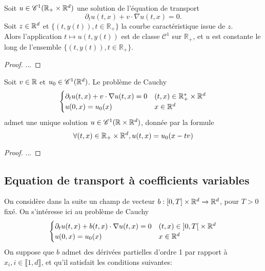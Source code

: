 \documentclass[french,a4paper,10pt]{article}
\begin{document}
            \begin{proposition}\label{prop:1.1.3}
                Soit \( u \in \mathscr{C}^1(\mathbb{R}_+ \times \mathbb{R}^d) \) une solution de l'équation de transport 
                \[
                \partial_t u(t,x) +v \cdot \nabla u(t,x) = 0.
                \]
                Soit \( z \in \mathbb{R}^d \) et \( \{ (t, y(t)), t \in \mathbb{R}_+ \} \) la courbe caractéristique issue de \( z \). \\
                Alors l'application \( t \mapsto u(t, y(t)) \) est de classe \( \mathscr{C}^1 \) sur \( \mathbb{R}_+ \), et \( u \) est constante le long de l'ensemble \( \{ (t, y(t)), t \in \mathbb{R}_+ \} \).
            \end{proposition}
        
            \begin{proof}
                ...
            \end{proof}
            
            \begin{theorem}\label{thm:1.1.4}
                Soit $v \in \mathbb{R}$ et $u_0 \in \mathscr{C}^1(\mathbb{R}^d)$. Le problème de Cauchy
                \[
                \begin{cases}
                    \partial_t u(t,x) + v \cdot \nabla u(t,x)  = 0 & (t,x) \in \mathbb{R}^*_+ \times \mathbb{R}^d \\
                    u(0,x)  = u_0(x) &x \in \mathbb{R}^d
                \end{cases}
                \]
                admet une unique solution $u \in \mathscr{C}^1(\mathbb{R} \times \mathbb{R}^d)$, donnée par la formule 
                \[
                \forall (t,x) \in \mathbb{R}_+ \times \mathbb{R}^d, u(t,x) = u_0(x-tv)
                \]
            \end{theorem}
            
            \begin{proof}
                ...
            \end{proof}
    
        \subsection{Equation de transport à coefficients variables}\label{subsec:1.2}
        
            On considère dans la suite un champ de vecteur $b : [0,T]\times \mathbb{R}^d \xrightarrow{} \mathbb{R}^d$, pour $T>0$ fixé.
            On s'intéresse ici au problème de Cauchy 
            \[
            \begin{cases}
                \partial_t u(t,x) + b(t,x) \cdot \nabla u(t,x)  = 0 & (t,x) \in \mathopen{}\left]0,T\right[\mathclose{} \times \mathbb{R}^d \\
                u(0,x)  = u_0(x) &x \in \mathbb{R}^d
            \end{cases}
            \]
            On suppose que $b$ admet des dérivées partielles d'ordre 1 par rapport à $x_i, i\in \llbracket 1, d \rrbracket$, et qu'il satisfait les conditions suivantes:
\end{document}

